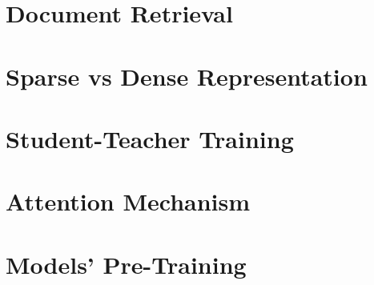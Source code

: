 
\section{Document Retrieval}
\section{Sparse vs Dense Representation}
\section{Student-Teacher Training}
\section{Attention Mechanism}
\section{Models' Pre-Training}